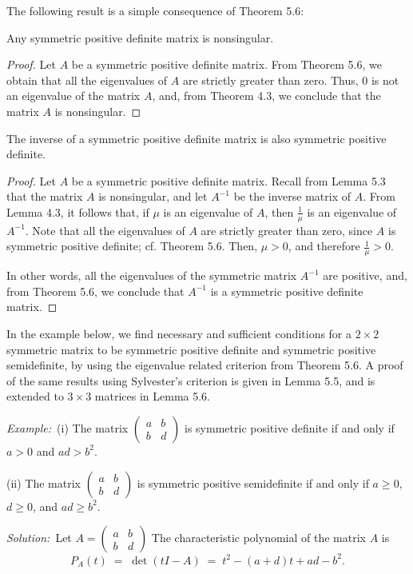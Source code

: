 The following result is a simple consequence of Theorem 5.6:

\begin{lemma}
Any symmetric positive definite matrix is nonsingular.
\end{lemma}

\begin{proof}
Let $A$ be a symmetric positive definite matrix. From Theorem 5.6, we obtain that all
the eigenvalues of $A$ are strictly greater than zero. Thus, $0$ is not an eigenvalue
of the matrix $A$, and, from Theorem 4.3, we conclude that the matrix $A$ is
nonsingular.
\end{proof}

\begin{lemma}
The inverse of a symmetric positive definite matrix is also symmetric positive
definite.
\end{lemma}

\begin{proof}
Let $A$ be a symmetric positive definite matrix. Recall from Lemma 5.3 that the
matrix $A$ is nonsingular, and let $A^{-1}$ be the inverse matrix of $A$. From
Lemma 4.3, it follows that, if $\mu$ is an eigenvalue of $A$, then $\frac{1}{\mu}$ is
an eigenvalue of $A^{-1}$. Note that all the eigenvalues of $A$ are strictly greater
than zero, since $A$ is symmetric positive definite; cf. Theorem 5.6. Then, $\mu > 0$,
and therefore $\frac{1}{\mu} > 0$.

In other words, all the eigenvalues of the symmetric matrix $A^{-1}$ are positive,
and, from Theorem 5.6, we conclude that $A^{-1}$ is a symmetric positive definite
matrix.
\end{proof}

In the example below, we find necessary and sufficient conditions for a $2 \times 2$
symmetric matrix to be symmetric positive definite and symmetric positive
semidefinite, by using the eigenvalue related criterion from Theorem 5.6. A proof of
the same results using Sylvester's criterion is given in Lemma 5.5, and is extended to
$3 \times 3$ matrices in Lemma 5.6.

\par\medskip\noindent\textit{Example:}\ (i) The matrix
$\begin{pmatrix} a & b\\ b & d \end{pmatrix}$ is symmetric positive definite if and
only if $a > 0$ and $ad > b^2$.

(ii) The matrix $\begin{pmatrix} a & b\\ b & d \end{pmatrix}$ is symmetric positive
semidefinite if and only if $a \geq 0$, $d \geq 0$, and $ad \geq b^2$.

\par\medskip\noindent\textit{Solution:}\ Let $A = \begin{pmatrix} a & b\\ b & d
\end{pmatrix}$ The characteristic polynomial of the matrix $A$ is
\begin{equation}
P_A(t) \;=\; \det(tI-A) \;=\; t^2 - (a+d)t + ad - b^2.
\end{equation}

